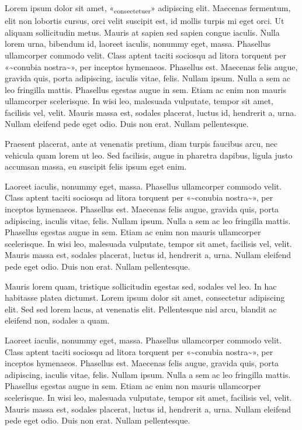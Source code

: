 Lorem ipsum dolor sit amet, «\textsubscript{consectetuer}» adipiscing
elit. Maecenas fermentum, elit non lobortis cursus, orci velit suscipit
est, id mollis turpis mi eget orci. Ut aliquam sollicitudin metus.
Mauris at sapien sed sapien congue iaculis. Nulla lorem urna, bibendum
id, laoreet iaculis, nonummy eget, massa. Phasellus ullamcorper commodo
velit. Class aptent taciti sociosqu ad litora torquent per
«\textasciitilde conubia nostra\textasciitilde», per inceptos hymenaeos.
Phasellus est. Maecenas felis augue, gravida quis, porta adipiscing,
iaculis vitae, felis. Nullam ipsum. Nulla a sem ac leo fringilla mattis.
Phasellus egestas augue in sem. Etiam ac enim non mauris ullamcorper
scelerisque. In wisi leo, malesuada vulputate, tempor sit amet,
facilisis vel, velit. Mauris massa est, sodales placerat, luctus id,
hendrerit a, urna. Nullam eleifend pede eget odio. Duis non erat. Nullam
pellentesque.

Praesent placerat, ante at venenatis pretium, diam turpis faucibus arcu,
nec vehicula quam lorem ut leo. Sed facilisis, augue in pharetra
dapibus, ligula justo accumsan massa, eu suscipit felis ipsum eget enim.

Laoreet iaculis, nonummy eget, massa. Phasellus ullamcorper commodo
velit. Class aptent taciti sociosqu ad litora torquent per
«\textasciitilde conubia nostra\textasciitilde», per inceptos hymenaeos.
Phasellus est. Maecenas felis augue, gravida quis, porta adipiscing,
iaculis vitae, felis. Nullam ipsum. Nulla a sem ac leo fringilla mattis.
Phasellus egestas augue in sem. Etiam ac enim non mauris ullamcorper
scelerisque. In wisi leo, malesuada vulputate, tempor sit amet,
facilisis vel, velit. Mauris massa est, sodales placerat, luctus id,
hendrerit a, urna. Nullam eleifend pede eget odio. Duis non erat. Nullam
pellentesque.

Mauris lorem quam, tristique sollicitudin egestas sed, sodales vel leo.
In hac habitasse platea dictumst. Lorem ipsum dolor sit amet,
consectetur adipiscing elit. Sed sed lorem lacus, at venenatis elit.
Pellentesque nisl arcu, blandit ac eleifend non, sodales a quam.

Laoreet iaculis, nonummy eget, massa. Phasellus ullamcorper commodo
velit. Class aptent taciti sociosqu ad litora torquent per
«\textasciitilde conubia nostra\textasciitilde», per inceptos hymenaeos.
Phasellus est. Maecenas felis augue, gravida quis, porta adipiscing,
iaculis vitae, felis. Nullam ipsum. Nulla a sem ac leo fringilla mattis.
Phasellus egestas augue in sem. Etiam ac enim non mauris ullamcorper
scelerisque. In wisi leo, malesuada vulputate, tempor sit amet,
facilisis vel, velit. Mauris massa est, sodales placerat, luctus id,
hendrerit a, urna. Nullam eleifend pede eget odio. Duis non erat. Nullam
pellentesque.
